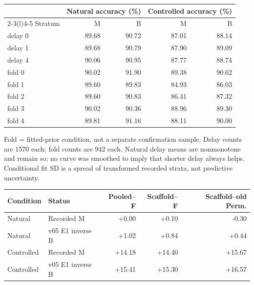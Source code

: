 \documentclass[10pt,letterpaper]{article}
\newcommand{\B}[1]{{\color{GuideBlue}#1}}
\newcommand{\note}[1]{{\fontsize{8.5}{10.5}\selectfont #1\par}}
\newenvironment{clean}{\begin{center}\fontsize{9.5}{11.5}\selectfont\setlength{\tabcolsep}{6pt}\renewcommand{\arraystretch}{1.06}}{\end{center}}
\begin{document}
\par\noindent\begin{minipage}{\linewidth}\end{minipage}\par
\begin{clean}\begin{tabular}{@{}lrrrr@{}}
\toprule
& \multicolumn{2}{c}{Natural accuracy (\%)} & \multicolumn{2}{c}{Controlled accuracy (\%)} \\ \cmidrule(lr){2-3}\cmidrule(l){4-5} Stratum & M & B & M & B \\
\midrule
delay 0 & 89.68 & \B{90.72} & 87.01 & \B{88.14} \\
delay 1 & 89.68 & \B{90.79} & 87.90 & \B{89.09} \\
delay 4 & 90.06 & \B{90.95} & 87.77 & \B{88.74} \\
fold 0 & 90.02 & \B{91.90} & 89.38 & \B{90.62} \\
fold 1 & 89.60 & \B{89.83} & 84.93 & \B{86.03} \\
fold 2 & 89.60 & \B{90.83} & 86.41 & \B{87.32} \\
fold 3 & 90.02 & \B{90.36} & 88.96 & \B{89.30} \\
fold 4 & 89.81 & \B{91.16} & 88.11 & \B{90.00} \\
\bottomrule\end{tabular}\end{clean}
\note{Fold = fitted-prior condition, not a separate confirmation sample. Delay counts are 1570 each; fold counts are 942 each. Natural delay means are nonmonotone and remain so; no curve was smoothed to imply that shorter delay always helps. Conditional fit SD is a spread of transformed recorded strata, not predictive uncertainty.}
\par\noindent\begin{minipage}{\linewidth}\end{minipage}\par
\begin{clean}\begin{tabular}{@{}llrrr@{}}
\toprule
Condition & Status & Pooled--F & Scaffold--F & Scaffold--old Perm. \\
\midrule
Natural & Recorded M & +0.00 & +0.10 & -0.30 \\
Natural & v05 E1 inverse B & \B{+1.02} & \B{+0.84} & \B{+0.44} \\
Controlled & Recorded M & +14.18 & +14.40 & +15.67 \\
Controlled & v05 E1 inverse B & \B{+15.41} & \B{+15.30} & \B{+16.57} \\
\bottomrule\end{tabular}\end{clean}
\end{document}
